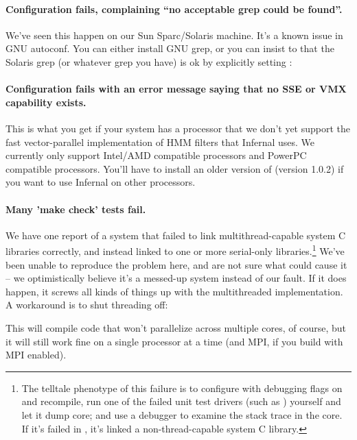 
\paragraph{Configuration fails, complaining ``no acceptable grep could
  be found''.} We've seen this happen on our Sun Sparc/Solaris
machine. It's a known issue in GNU autoconf. You can either install
GNU grep, or you can insist to  that the Solaris
grep (or whatever grep you have) is ok by explicitly setting
:


\paragraph{Configuration fails with an error message saying that no
  SSE or VMX capability exists.}
This is what you get if
your system has a processor that we don't yet support the fast
vector-parallel implementation of HMM filters that Infernal
uses. We currently only support Intel/AMD
compatible processors and PowerPC compatible processors. You'll have
to install an older version of (version 1.0.2) if you want to use
Infernal on other processors.

\paragraph{Many 'make check' tests fail.} We have one report of a
system that failed to link multithread-capable system C libraries
correctly, and instead linked to one or more serial-only
libraries.\footnote{The telltale phenotype of this failure is to
  configure with debugging flags on and recompile, run one of the
  failed unit test drivers (such as )
  yourself and let it dump core; and use a debugger to examine the
  stack trace in the core. If it's failed in
  , it's linked a non-thread-capable
  system C library.} We've been unable to reproduce the problem here,
and are not sure what could cause it -- we optimistically believe it's
a messed-up system instead of our fault. If it does happen, it screws
all kinds of things up with the multithreaded implementation. A
workaround is to shut threading off:


This will compile code that won't parallelize across multiple cores,
of course, but it will still work fine on a single processor at a time
(and MPI, if you build with MPI enabled).

